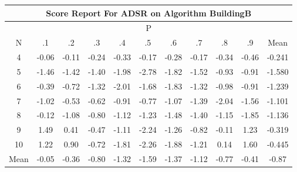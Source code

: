 \documentclass[11pt,a4paper]{report}
\begin{document}
\begin{longtable}{ | c || c | c | c | c | c | c | c | c | c || c |}
\hline
\multicolumn{11}{|c|}{ Score Report For ADSR on Algorithm BuildingB} \\
\hline
\multicolumn{11}{|c|}{ P } \\
\hline
N & .1 & .2 & .3 & .4 & .5 & .6 & .7 & .8 & .9 & Mean\\
 \hline
 \hline
 \endhead
  4 &  \cellcolor[HTML]{FFFFFF} -0.06 &  \cellcolor[HTML]{FFFFFF} -0.11 &  \cellcolor[HTML]{FFF7F7} -0.24 &  \cellcolor[HTML]{FFF7F7} -0.33 &  \cellcolor[HTML]{FFF7F7} -0.17 &  \cellcolor[HTML]{FFF7F7} -0.28 &  \cellcolor[HTML]{FFF7F7} -0.17 &  \cellcolor[HTML]{FFF7F7} -0.34 &  \cellcolor[HTML]{FFF7F7} -0.46 & -0.241 \\
  5 &  \cellcolor[HTML]{FFD7D7} -1.46 &  \cellcolor[HTML]{FFDFDF} -1.42 &  \cellcolor[HTML]{FFDFDF} -1.40 &  \cellcolor[HTML]{FFCFCF} -1.98 &  \cellcolor[HTML]{FFB7B7} -2.78 &  \cellcolor[HTML]{FFCFCF} -1.82 &  \cellcolor[HTML]{FFD7D7} -1.52 &  \cellcolor[HTML]{FFE7E7} -0.93 &  \cellcolor[HTML]{FFE7E7} -0.91 & -1.580 \\
  6 &  \cellcolor[HTML]{FFF7F7} -0.39 &  \cellcolor[HTML]{FFEFEF} -0.72 &  \cellcolor[HTML]{FFDFDF} -1.32 &  \cellcolor[HTML]{FFCFCF} -2.01 &  \cellcolor[HTML]{FFD7D7} -1.68 &  \cellcolor[HTML]{FFCFCF} -1.83 &  \cellcolor[HTML]{FFDFDF} -1.32 &  \cellcolor[HTML]{FFE7E7} -0.98 &  \cellcolor[HTML]{FFE7E7} -0.91 & -1.239 \\
  7 &  \cellcolor[HTML]{FFE7E7} -1.02 &  \cellcolor[HTML]{FFEFEF} -0.53 &  \cellcolor[HTML]{FFEFEF} -0.62 &  \cellcolor[HTML]{FFE7E7} -0.91 &  \cellcolor[HTML]{FFEFEF} -0.77 &  \cellcolor[HTML]{FFE7E7} -1.07 &  \cellcolor[HTML]{FFDFDF} -1.39 &  \cellcolor[HTML]{FFCFCF} -2.04 &  \cellcolor[HTML]{FFD7D7} -1.56 & -1.101 \\
  8 &  \cellcolor[HTML]{FFFFFF} -0.12 &  \cellcolor[HTML]{FFE7E7} -1.08 &  \cellcolor[HTML]{FFE7E7} -0.80 &  \cellcolor[HTML]{FFDFDF} -1.12 &  \cellcolor[HTML]{FFDFDF} -1.23 &  \cellcolor[HTML]{FFD7D7} -1.48 &  \cellcolor[HTML]{FFDFDF} -1.40 &  \cellcolor[HTML]{FFDFDF} -1.15 &  \cellcolor[HTML]{FFCFCF} -1.85 & -1.136 \\
  9 &  \cellcolor[HTML]{D7D7FF} 1.49 &  \cellcolor[HTML]{F7F7FF} 0.41 &  \cellcolor[HTML]{FFF7F7} -0.47 &  \cellcolor[HTML]{FFE7E7} -1.11 &  \cellcolor[HTML]{FFC7C7} -2.24 &  \cellcolor[HTML]{FFDFDF} -1.26 &  \cellcolor[HTML]{FFE7E7} -0.82 &  \cellcolor[HTML]{FFFFFF} -0.11 &  \cellcolor[HTML]{DFDFFF} 1.23 & -0.319 \\
  10 &  \cellcolor[HTML]{DFDFFF} 1.22 &  \cellcolor[HTML]{E7E7FF} 0.90 &  \cellcolor[HTML]{FFEFEF} -0.72 &  \cellcolor[HTML]{FFCFCF} -1.81 &  \cellcolor[HTML]{FFC7C7} -2.26 &  \cellcolor[HTML]{FFCFCF} -1.88 &  \cellcolor[HTML]{FFDFDF} -1.21 &  \cellcolor[HTML]{FFFFFF} 0.14 &  \cellcolor[HTML]{D7D7FF} 1.60 & -0.445 \\
 \hline
 \hline
Mean &  \cellcolor[HTML]{FFFFFF} -0.05 &  \cellcolor[HTML]{FFF7F7} -0.36 &  \cellcolor[HTML]{FFE7E7} -0.80 &  \cellcolor[HTML]{FFDFDF} -1.32 &  \cellcolor[HTML]{FFD7D7} -1.59 &  \cellcolor[HTML]{FFDFDF} -1.37 &  \cellcolor[HTML]{FFDFDF} -1.12 &  \cellcolor[HTML]{FFEFEF} -0.77 &  \cellcolor[HTML]{FFF7F7} -0.41 &  \cellcolor[HTML]{FFE7E7} -0.87
\end{longtable}
\end{document}

